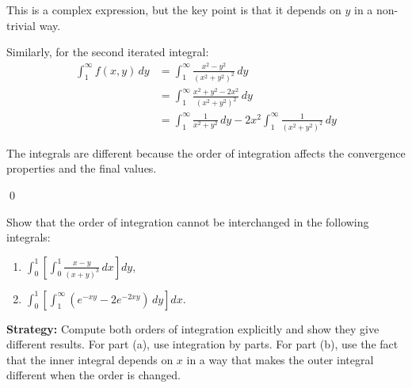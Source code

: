 \begin{enumerate}[label=(\alph*)]
This is a complex expression, but the key point is that it depends on $y$ in a non-trivial way.

Similarly, for the second iterated integral:
\begin{align*}
\int_{1}^{\infty} f(x, y) \, dy &= \int_{1}^{\infty} \frac{x^2 - y^2}{(x^2 + y^2)^2} \, dy \\
&= \int_{1}^{\infty} \frac{x^2 + y^2 - 2x^2}{(x^2 + y^2)^2} \, dy \\
&= \int_{1}^{\infty} \frac{1}{x^2 + y^2} \, dy - 2x^2 \int_{1}^{\infty} \frac{1}{(x^2 + y^2)^2} \, dy
\end{align*}

The integrals are different because the order of integration affects the convergence properties and the final values.
\end{enumerate}\qed


\begin{problembox}
Show that the order of integration cannot be interchanged in the following integrals:
\begin{enumerate}[label=(\alph*)]
\item $\int_{0}^{1} \left[ \int_{0}^{1} \frac{x - y}{(x + y)^{3}} \, dx \right] dy$,
\item $\int_{0}^{1} \left[ \int_{1}^{\infty} (e^{-xy} - 2e^{-2xy}) \, dy \right] dx.$
\end{enumerate}
\end{problembox}

\noindent\textbf{Strategy:} Compute both orders of integration explicitly and show they give different results. For part (a), use integration by parts. For part (b), use the fact that the inner integral depends on $x$ in a way that makes the outer integral different when the order is changed.

